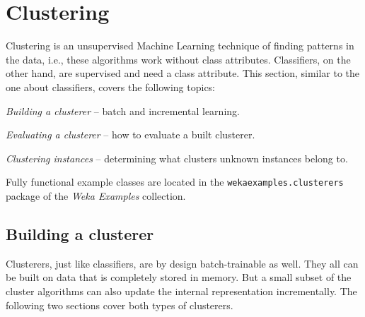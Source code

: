 \newpage

\section{Clustering}
\label{api_clustering}
Clustering is an unsupervised Machine Learning technique of finding patterns in
the data, i.e., these algorithms work without class attributes. Classifiers, on
the other hand, are supervised and need a class attribute. This section,
similar to the one about classifiers, covers the following topics:
\begin{tight_itemize}
	\item \textit{Building a clusterer} -- batch and incremental learning.
	\item \textit{Evaluating a clusterer} -- how to evaluate a built clusterer.
	\item \textit{Clustering instances} -- determining what clusters unknown
instances belong to.
\end{tight_itemize}
Fully functional example classes are located in the
\texttt{wekaexamples.clusterers} package of the \textit{Weka Examples}
collection\cite{wekaexamples}.

\subsection{Building a clusterer}
Clusterers, just like classifiers, are by design batch-trainable as well. They
all can be built on data that is completely stored in memory. But a small subset
of the cluster algorithms can also update the internal representation
incrementally. The following two sections cover both types of clusterers.

